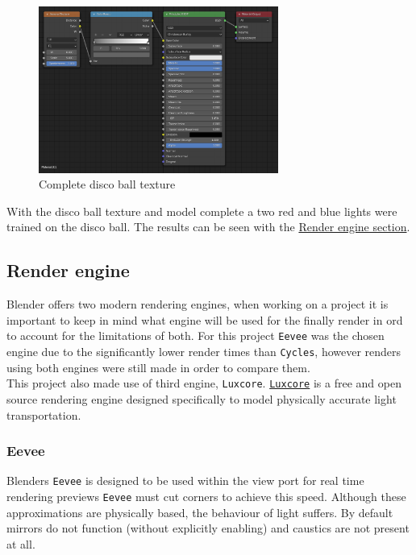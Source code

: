 \documentclass[11pt]{article}
\begin{document}
\begin{figure}[htbp]
\centering
\includegraphics[width=0.7\textwidth]{Images/discoball_texture.png}
\caption{Complete disco ball texture}
\end{figure}
\newpage
With the disco ball texture and model complete a two red and blue lights were
trained on the disco ball. The results can be seen with the \hyperref[sec:orgc163b91]{Render engine section}.
\subsection{Render engine}
\label{sec:orgc163b91}
Blender offers two modern rendering engines, when working on a project it is
important to keep in mind what engine will be used for the finally render in ord
to account for the limitations of both. For this project \texttt{Eevee} was the chosen
engine due to the significantly lower render times than \texttt{Cycles}, however
renders using both engines were still made in order to compare them.\\

This project also made use of third engine, \texttt{Luxcore}. \href{https://luxcorerender.org/}{\texttt{Luxcore}} is a free and
open source rendering engine designed specifically to model physically accurate
light transportation.
\newpage
\subsubsection{Eevee}
\label{sec:org7013092}
Blenders \texttt{Eevee} is designed to be used within the view port for real time rendering previews
\texttt{Eevee} must cut corners to achieve this speed. Although these
approximations are physically based, the behaviour of light suffers. By default
mirrors do not function (without explicitly enabling) and caustics are not present at all.\\
\end{document}
